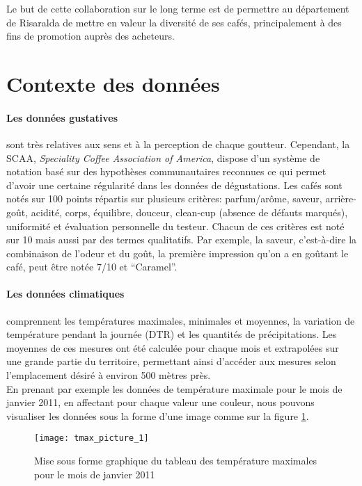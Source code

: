 Le but de cette collaboration sur le long terme est de permettre au département de Risaralda de mettre en valeur la diversité de ses cafés, principalement à des fins de promotion auprès des acheteurs. \\


\section{Contexte des données}
\paragraph{Les données gustatives}sont très relatives aux sens et à la perception de chaque goutteur. Cependant, la SCAA, \textit{Speciality Coffee Association of America}, dispose d’un système de notation basé sur des hypothèses communautaires reconnues ce qui permet d’avoir une certaine régularité dans les données de dégustations. Les cafés sont notés sur 100 points répartis sur plusieurs critères: parfum/arôme, saveur, arrière-goût, acidité, corps, équilibre, douceur, clean-cup (absence de défauts marqués), uniformité et évaluation personnelle du testeur.  Chacun de ces critères est noté sur 10 mais aussi par des termes qualitatifs. Par exemple, la saveur, c’est-à-dire la combinaison de l’odeur et du goût, la première impression qu’on a en goûtant le café, peut être notée 7/10 et “Caramel”. 

\paragraph{Les données climatiques}comprennent les températures maximales, minimales et moyennes, la variation de température pendant la journée (DTR) et les quantités de précipitations. Les moyennes de ces mesures ont été calculée pour chaque mois et extrapolées sur une grande partie du territoire, permettant ainsi d’accéder aux mesures selon l’emplacement désiré à environ 500 mètres près. \\

En prenant par exemple les données de température maximale pour le mois de janvier 2011, en affectant pour chaque valeur une couleur, nous pouvons visualiser les données sous la forme d'une image comme sur la figure \ref{tmax_picture}.


\begin{figure}[H]
	\texttt{[image: tmax\_picture\_1]}
	\caption{\label{tmax_picture} Mise sous forme graphique du tableau des température maximales pour le mois de janvier 2011 }
\end{figure}

